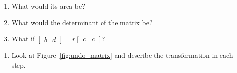 \documentclass[../gatm_answers.tex]{subfiles}
\begin{document}
\begin{enumerate}
\begin{enumerate}
\begin{enumerate}
\item What would its area be?
\item What would the determinant of the matrix be?
\item What if $\left[\begin{smallmatrix}b & d \end{smallmatrix}\right]=r\left[\begin{smallmatrix}a & c \end{smallmatrix}\right]$?
\end{enumerate}
\end{enumerate}
\setcounter{problem_i}{\value{enumi}}
\end{enumerate}


\begin{enumerate}
\setcounter{enumi}{\value{problem_i}}
\item Look at Figure~\ref{fig:undo_matrix} and describe the transformation in each step.
\setcounter{problem_i}{\value{enumi}}
\end{enumerate}
\end{document}
